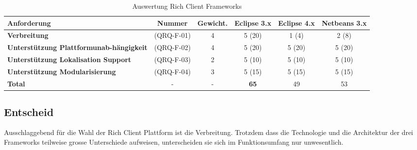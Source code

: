 \begin{longtable}{|p{3cm}|c|c|c|c|c|}
    \caption{Auswertung Rich Client Frameworks}\\\hline
 \textbf{Anforderung} & \textbf{Nummer} &  \textbf{Gewicht.} & \textbf{Eclipse 3.x} & \textbf{Eclipse 4.x} &  \textbf{Netbeans 3.x}\\\hline
   \textbf{Verbreitung} & (QRQ-F-01) & 4 & 5 (20) & 1 (4) & 2 (8)\\\hline
   \textbf{Unterstützung Plattformunab-hängigkeit} & (QRQ-F-02) & 4 & 5 (20) & 5 (20) & 5 (20)\\\hline
   \textbf{Unterstützung Lokalisation Support} & (QRQ-F-03) & 2 & 5 (10) & 5 (10) & 5 (10) \\\hline
   \textbf{Unterstützung Modularisierung} & (QRQ-F-04) & 3 & 5 (15) & 5 (15) & 5 (15) \\\hline
   \textbf{Total} & - & - & \textbf{65} & 49 & 53\\\hline
\end{longtable}


\subsection{Entscheid}\label{rcp_entscheid}
Ausschlaggebend für die Wahl der Rich Client Plattform ist die Verbreitung. Trotzdem dass die Technologie und die Architektur der drei Frameworks teilweise grosse Unterschiede aufweisen, unterscheiden sie sich im Funktionsumfang nur unwesentlich. 

